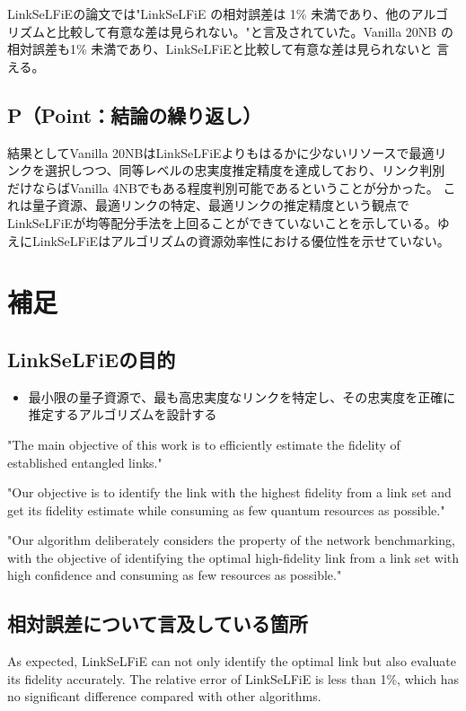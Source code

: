 \documentclass[conference]{IEEEtran}
\begin{document}
LinkSeLFiEの論文では"LinkSeLFiE の相対誤差は 1\% 未満であり、他のアルゴ
リズムと比較して有意な差は見られない。"と言及されていた。Vanilla 20NB
の相対誤差も1\% 未満であり、LinkSeLFiEと比較して有意な差は見られないと
言える。




\subsection{P（Point：結論の繰り返し）}
\label{sec:org0f48dd2}
結果としてVanilla 20NBはLinkSeLFiEよりもはるかに少ないリソースで最適リ
ンクを選択しつつ、同等レベルの忠実度推定精度を達成しており、リンク判別
だけならばVanilla 4NBでもある程度判別可能であるということが分かった。
これは量子資源、最適リンクの特定、最適リンクの推定精度という観点で
LinkSeLFiEが均等配分手法を上回ることができていないことを示している。ゆ
えにLinkSeLFiEはアルゴリズムの資源効率性における優位性を示せていない。


\section{補足}
\label{sec:orgef718c1}
\subsection{LinkSeLFiEの目的}
\label{sec:orgbec4ddf}
\begin{itemize}
\item 最小限の量子資源で、最も高忠実度なリンクを特定し、その忠実度を正確に推定するアルゴリズムを設計する
\end{itemize}

"The main objective of this work is to efficiently estimate the fidelity of established entangled links."

"Our objective is to identify the link with the highest fidelity from a
link set and get its fidelity estimate while consuming as few quantum
resources as possible."

"Our algorithm deliberately considers the property of the network
benchmarking, with the objective of identifying the optimal
high-fidelity link from a link set with high confidence and consuming
as few resources as possible."

\subsection{相対誤差について言及している箇所}
\label{sec:orgd4c8a83}
As expected, LinkSeLFiE can not only identify the optimal link but
also evaluate its fidelity accurately. The relative error of
LinkSeLFiE is less than 1\%, which has no significant difference
compared with other algorithms.
\end{document}
